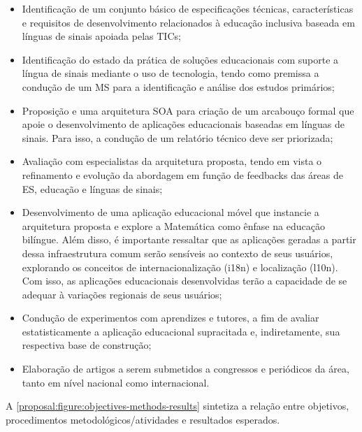 \begin{itemize}
  \item Identificação de um conjunto básico de especificações técnicas, características e requisitos de desenvolvimento relacionados à educação inclusiva baseada em línguas de sinais apoiada pelas TICs;
  
  \item Identificação do estado da prática de soluções educacionais com suporte a língua de sinais mediante o uso de tecnologia, tendo como premissa a condução de um MS para a identificação e análise dos estudos primários;
  
  \item Proposição e uma arquitetura SOA para criação de um arcabouço formal que apoie o desenvolvimento de aplicações educacionais baseadas em línguas de sinais. %
  Para isso, a condução de um relatório técnico deve ser priorizada; 
  
  \item Avaliação com especialistas da arquitetura proposta, tendo em vista o refinamento e evolução da abordagem em função de feedbacks das áreas de ES, educação e línguas de sinais;
  
  \item Desenvolvimento de uma aplicação educacional móvel que instancie a arquitetura proposta e explore a Matemática como ênfase na educação bilíngue. Além disso, é importante ressaltar que as aplicações geradas a partir dessa infraestrutura comum serão sensíveis ao contexto de seus usuários, explorando os conceitos de internacionalização (i18n) e localização (l10n). Com isso, as aplicações educacionais desenvolvidas terão a capacidade de se adequar à variações regionais de seus usuários;
  
  \item Condução de experimentos com aprendizes e tutores, a fim de avaliar estatisticamente a aplicação educacional supracitada e, indiretamente, sua respectiva base de construção;
  
  \item Elaboração de artigos a serem submetidos a congressos e periódicos da área, tanto em nível nacional como internacional.
\end{itemize}

A \autoref{proposal:figure:objectives-methods-results} sintetiza a relação entre objetivos, procedimentos metodológicos/atividades e resultados esperados.

